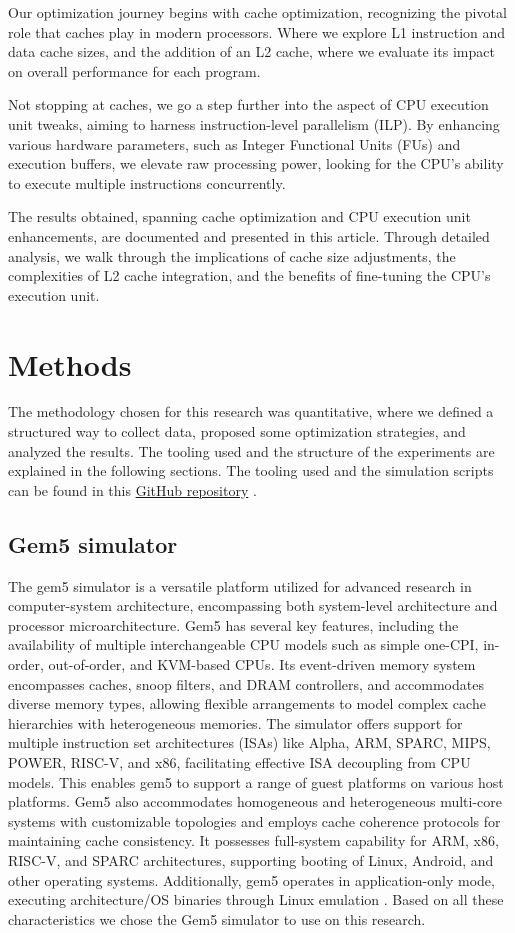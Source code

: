 \documentclass[
	article,			%
	11pt,				%
	oneside,			%
	a4paper,			%
	brazil,				%
        english,			%
	sumario=tradicional
	]{abntex2}
\begin{document}
Our optimization journey begins with cache optimization, recognizing the pivotal role that caches play in modern processors. Where we explore L1 instruction and data cache sizes, and the addition of an L2 cache, where we evaluate its impact on overall performance for each program.

Not stopping at caches, we go a step further into the aspect of CPU execution unit tweaks, aiming to harness instruction-level parallelism (ILP). By enhancing various hardware parameters, such as Integer Functional Units (FUs) and execution buffers, we elevate raw processing power, looking for the CPU's ability to execute multiple instructions concurrently.

The results obtained, spanning cache optimization and CPU execution unit enhancements, are documented and presented in this article. Through detailed analysis, we walk through the implications of cache size adjustments, the complexities of L2 cache integration, and the benefits of fine-tuning the CPU's execution unit.


\section{Methods}
The methodology chosen for this research was quantitative, where we defined a structured way to collect data, proposed some optimization strategies, and analyzed the results. The tooling used and the structure of the experiments are explained in the following sections. The tooling used and the simulation scripts can be found in this \href{https://github.com/wbmaas/riscv-opt}{GitHub repository} \cite{riscv-opt}.
 
\subsection{Gem5 simulator}
The gem5 simulator is a versatile platform utilized for advanced research in computer-system architecture, encompassing both system-level architecture and processor microarchitecture. Gem5 has several key features, including the availability of multiple interchangeable CPU models such as simple one-CPI, in-order, out-of-order, and KVM-based CPUs. Its event-driven memory system encompasses caches, snoop filters, and DRAM controllers, and accommodates diverse memory types, allowing flexible arrangements to model complex cache hierarchies with heterogeneous memories. The simulator offers support for multiple instruction set architectures (ISAs) like Alpha, ARM, SPARC, MIPS, POWER, RISC-V, and x86, facilitating effective ISA decoupling from CPU models. This enables gem5 to support a range of guest platforms on various host platforms. Gem5 also accommodates homogeneous and heterogeneous multi-core systems with customizable topologies and employs cache coherence protocols for maintaining cache consistency. It possesses full-system capability for ARM, x86, RISC-V, and SPARC architectures, supporting booting of Linux, Android, and other operating systems. Additionally, gem5 operates in application-only mode, executing architecture/OS binaries through Linux emulation \cite{gem5}. Based on all these characteristics we chose the Gem5 simulator to use on this research.
\end{document}
